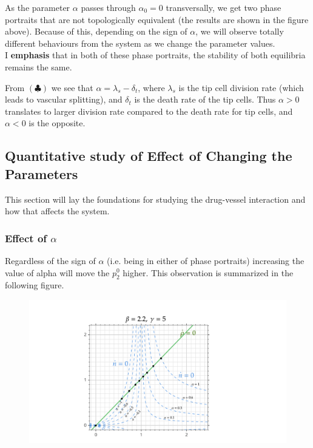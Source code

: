 \FloatBarrier

\begin{observation}
	As the parameter $\alpha$ passes through $\alpha_0 = 0$ transversally, we get two phase portraits that are not topologically equivalent (the results are shown in the figure above). Because of this, depending on the sign of $\alpha$, we will observe totally different behaviours from the system as we change the parameter values. \\
	I \textbf{emphasis} that in both of these phase portraits, the stability of both equilibria remains the same.
\end{observation}

\begin{observation}
	From $(\clubsuit)$ we see that $\alpha = \lambda_s - \delta_t$, where $\lambda_s$ is the tip cell division rate (which leads to vascular splitting), and $\delta_t$ is the death rate of the tip cells. Thus $\alpha >0$ translates to larger division rate compared to the death rate for tip cells, and $\alpha<0$ is the opposite.
\end{observation}





\subsection*{Quantitative study of Effect of Changing the Parameters}
This section will lay the foundations for studying the drug-vessel interaction and how that affects the system.
\subsubsection*{Effect of $\alpha$} 
Regardless of the sign of $\alpha$ (i.e. being in either of phase portraits) increasing the value of alpha will move the $p^0_2$ higher. This observation is summarized in the following figure.
\begin{figure}[h!]
	\centering
	\includegraphics[width=\linewidth]{images/effectOfAlpha.png} %
\end{figure}

